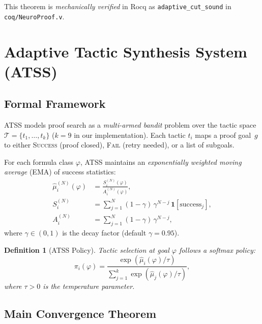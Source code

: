 \documentclass[conference]{IEEEtran}
\newtheorem{definition}[theorem]{Definition}
\newcommand{\ATSS}{\textsc{ATSS}}
\begin{document}
\noindent This theorem is \emph{mechanically verified} in Rocq as
\texttt{adaptive\_cut\_sound} in \texttt{coq/NeuroProof.v}.

\section{Adaptive Tactic Synthesis System (ATSS)}
\label{sec:atss}

\subsection{Formal Framework}

\ATSS{} models proof search as a \emph{multi-armed bandit} problem
over the tactic space $\mathcal{T} = \{t_1, \ldots, t_k\}$
($k=9$ in our implementation).  Each tactic $t_i$ maps a proof
goal~$g$ to either \textsc{Success} (proof closed), \textsc{Fail}
(retry needed), or a list of subgoals.

For each formula class $\varphi$, \ATSS{} maintains an
\emph{exponentially weighted moving average} (EMA) of success
statistics:
\begin{equation}
  \begin{aligned}
  \hat{\mu}_i^{(N)}(\varphi) &=
    \frac{S_i^{(N)}(\varphi)}{A_i^{(N)}(\varphi)}, \\
  S_i^{(N)} &= \sum_{j=1}^{N} (1{-}\gamma)\,\gamma^{N-j}\,
    \mathbf{1}[\text{success}_j], \\
  A_i^{(N)} &= \sum_{j=1}^{N} (1{-}\gamma)\,\gamma^{N-j},
  \end{aligned}
\end{equation}
where $\gamma \in (0,1)$ is the decay factor (default $\gamma=0.95$).

\begin{definition}[ATSS Policy]
  Tactic selection at goal $\varphi$ follows a softmax policy:
  \begin{equation}
    \pi_i(\varphi) =
      \frac{\exp(\hat{\mu}_i(\varphi)/\tau)}
           {\sum_{j=1}^{k}\exp(\hat{\mu}_j(\varphi)/\tau)},
  \end{equation}
  where $\tau > 0$ is the temperature parameter.
\end{definition}

\subsection{Main Convergence Theorem}
\end{document}
